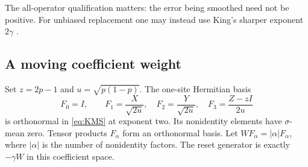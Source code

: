 \documentclass[11pt,reqno]{amsart}
\numberwithin{equation}{section}
\theoremstyle{definition}
\theoremstyle{remark}
\begin{document}
The all-operator qualification matters: the error being smoothed need not be positive. For unbiased replacement one may instead use King's sharper exponent $2\gamma$ \cite[Corollary~2, (17)]{King}.

\subsection{A moving coefficient weight}
Set $z=2p-1$ and $u=\sqrt{p(1-p)}$. The one-site Hermitian basis
\begin{equation}\label{eq:basis}
 F_0=I,\qquad F_1=\frac X{\sqrt{2u}},\quad
 F_2=\frac Y{\sqrt{2u}},\quad F_3=\frac{Z-zI}{2u}
\end{equation}
is orthonormal in \eqref{eq:KMS} at exponent two. Its nonidentity elements have $\sigma$-mean zero. Tensor products $F_\alpha$ form an orthonormal basis. Let $W F_\alpha=|\alpha|F_\alpha$, where $|\alpha|$ is the number of nonidentity factors. The reset generator is exactly $-\gamma W$ in this coefficient space.
\end{document}
